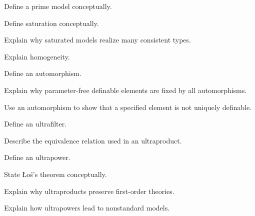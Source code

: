 \begin{exercise}[3]
Define a prime model conceptually.
\end{exercise}

\begin{exercise}[3]
Define saturation conceptually.
\end{exercise}

\begin{exercise}[3]
Explain why saturated models realize many consistent types.
\end{exercise}

\begin{exercise}[3]
Explain homogeneity.
\end{exercise}

\begin{exercise}[2]
Define an automorphism.
\end{exercise}

\begin{exercise}[3]
Explain why parameter-free definable elements are fixed by all
automorphisms.
\end{exercise}

\begin{exercise}[3]
Use an automorphism to show that a specified element is not uniquely
definable.
\end{exercise}

\begin{exercise}[2]
Define an ultrafilter.
\end{exercise}

\begin{exercise}[3]
Describe the equivalence relation used in an ultraproduct.
\end{exercise}

\begin{exercise}[3]
Define an ultrapower.
\end{exercise}

\begin{exercise}[3]
State Łoś's theorem conceptually.
\end{exercise}

\begin{exercise}[3]
Explain why ultraproducts preserve first-order theories.
\end{exercise}

\begin{exercise}[3]
Explain how ultrapowers lead to nonstandard models.
\end{exercise}

